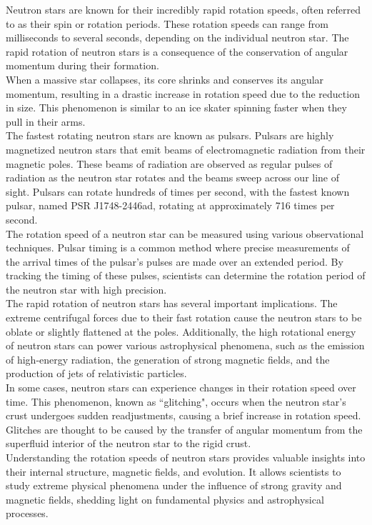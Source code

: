 Neutron stars are known for their incredibly rapid rotation speeds, often referred to as their spin or rotation periods. These rotation speeds can range from milliseconds to several seconds, depending on the individual neutron star. The rapid rotation of neutron stars is a consequence of the conservation of angular momentum during their formation.\\

When a massive star collapses, its core shrinks and conserves its angular momentum, resulting in a drastic increase in rotation speed due to the reduction in size. This phenomenon is similar to an ice skater spinning faster when they pull in their arms.\\

The fastest rotating neutron stars are known as pulsars. Pulsars are highly magnetized neutron stars that emit beams of electromagnetic radiation from their magnetic poles. These beams of radiation are observed as regular pulses of radiation as the neutron star rotates and the beams sweep across our line of sight. Pulsars can rotate hundreds of times per second, with the fastest known pulsar, named PSR J1748-2446ad, rotating at approximately 716 times per second.\\

The rotation speed of a neutron star can be measured using various observational techniques. Pulsar timing is a common method where precise measurements of the arrival times of the pulsar's pulses are made over an extended period. By tracking the timing of these pulses, scientists can determine the rotation period of the neutron star with high precision.\\

The rapid rotation of neutron stars has several important implications. The extreme centrifugal forces due to their fast rotation cause the neutron stars to be oblate or slightly flattened at the poles. Additionally, the high rotational energy of neutron stars can power various astrophysical phenomena, such as the emission of high-energy radiation, the generation of strong magnetic fields, and the production of jets of relativistic particles.\\

In some cases, neutron stars can experience changes in their rotation speed over time. This phenomenon, known as ``glitching", occurs when the neutron star's crust undergoes sudden readjustments, causing a brief increase in rotation speed. Glitches are thought to be caused by the transfer of angular momentum from the superfluid interior of the neutron star to the rigid crust.\\

Understanding the rotation speeds of neutron stars provides valuable insights into their internal structure, magnetic fields, and evolution. It allows scientists to study extreme physical phenomena under the influence of strong gravity and magnetic fields, shedding light on fundamental physics and astrophysical processes.